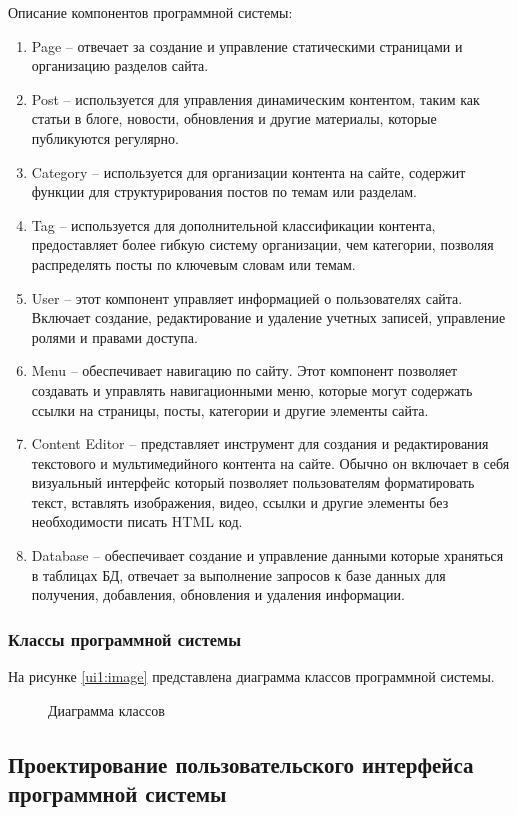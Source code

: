Описание компонентов программной системы:
\begin{enumerate}
	\item Page -- отвечает за создание и управление статическими страницами и организацию разделов сайта.
	\item Post -- используется для управления динамическим контентом, таким как статьи в блоге, новости, обновления и другие материалы, которые публикуются регулярно.
	\item Category -- используется для организации контента на сайте, содержит функции для структурирования постов по темам или разделам.
	\item Tag -- используется для дополнительной классификации контента, предоставляет более гибкую систему организации, чем категории, позволяя распределять посты по ключевым словам или темам.
	\item User -- этот компонент управляет информацией о пользователях сайта. Включает создание, редактирование и удаление учетных записей, управление ролями и правами доступа.
	\item Menu -- обеспечивает навигацию по сайту. Этот компонент позволяет создавать и управлять навигационными меню, которые могут содержать ссылки на страницы, посты, категории и другие элементы сайта.
	\item Content Editor -- представляет инструмент для создания и редактирования текстового и мультимедийного контента на сайте. Обычно он включает в себя визуальный интерфейс который позволяет пользователям форматировать текст, вставлять изображения, видео, ссылки и другие элементы без необходимости писать HTML код.
	\item Database -- обеспечивает создание и управление данными которые храняться в таблицах БД, отвечает за выполнение запросов к базе данных для получения, добавления, обновления и удаления информации.
\end{enumerate}

\subsubsection{Классы программной системы}
На рисунке \ref{ui1:image} представлена диаграмма классов программной системы.

\begin{figure}[ht]
	\caption{Диаграмма классов}
	\label{class:image}
\end{figure}

\subsection{Проектирование пользовательского интерфейса программной системы}

